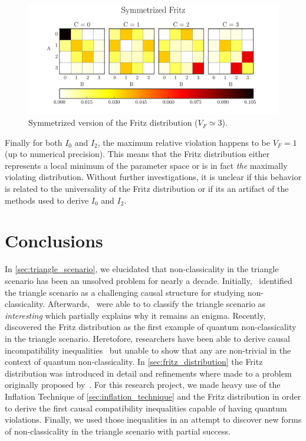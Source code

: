 \documentclass[aps, 10pt, english, twoside, pra, nofootinbib, tightenlines, longbibliography]{revtex4-1}
\begin{document}
    \begin{figure}
    \begin{center}
            \includegraphics[scale=0.6,trim={0 0 0 0.4in},clip]{../../figures/distributions/symmetrized_fritz.pdf}
            \caption{Symmetrized version of the Fritz distribution ($V_F \simeq 3$).}
            \label{fig:symmetrized_fritz}
    \end{center}
    \end{figure}

    Finally for both $I_0$ and $I_2$, the maximum relative violation happens to be $V_F = 1$ (up to numerical precision). This means that the Fritz distribution either represents a local minimum of the parameter space or is in fact \textit{the} maximally violating distribution. Without further investigations, it is unclear if this behavior is related to the universality of the Fritz distribution or if its an artifact of the methods used to derive $I_0$ and $I_2$.

    \section{Conclusions}

    In \cref{sec:triangle_scenario}, we elucidated that non-classicality in the triangle scenario has been an unsolved problem for nearly a decade. Initially,~\citet{Branciard_2012} identified the triangle scenario as a challenging causal structure for studying non-classicality. Afterwards,~\citet{Henson_2014} were able to to classify the triangle scenario as \textit{interesting} which partially explains why it remains an enigma. Recently,~\citet{Fritz_2012} discovered the Fritz distribution as the first example of quantum non-classicality in the triangle scenario. Heretofore, researchers have been able to derive causal incompatibility inequalities~\cite{Inflation,Steudel_2010,Henson_2014} but unable to show that any are non-trivial in the context of quantum non-classicality. In \cref{sec:fritz_distribution} the Fritz distribution was introduced in detail and refinements where made to a problem originally proposed by~\citet{Fritz_2012}. For this research project, we made heavy use of the Inflation Technique of \cref{sec:inflation_technique} and the Fritz distribution in order to derive the first causal compatibility inequalities capable of having quantum violations. Finally, we used those inequalities in an attempt to discover new forms of non-classicality in the triangle scenario with partial success.
\end{document}
